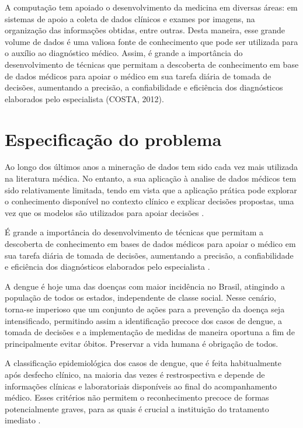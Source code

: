\documentclass[
	12pt,				%
	openright,			%
	oneside,	
	a4paper,				%
	english,				%
	brazil				%
]{abntex2/abntex2} %
\begin{document}
	A computação tem apoiado o desenvolvimento da medicina em diversas áreas: em sistemas de apoio a coleta de dados clínicos e exames por imagens, na organização das informações obtidas, entre outras. Desta maneira, esse grande volume de dados é uma valiosa fonte de conhecimento que pode ser utilizada para o auxílio ao diagnóstico médico. Assim, é grande a importância do desenvolvimento de técnicas que permitam a descoberta de conhecimento em base de dados médicos para apoiar o médico em sua tarefa diária de tomada de decisões, aumentando a precisão, a confiabilidade e eficiência dos diagnósticos elaborados pelo especialista (COSTA, 2012).

	\section{Especificação do problema}
		
		Ao longo dos últimos anos a mineração de dados tem sido cada vez mais utilizada na literatura médica. No entanto, a sua aplicação à analise de dados médicos tem sido relativamente limitada, tendo em vista que a aplicação prática pode explorar o conhecimento disponível no contexto clínico e explicar decisões propostas, uma vez que os modelos são utilizados para apoiar decisões \cite{bellazzi:2008}.
		
		É grande a importância do desenvolvimento de técnicas que permitam a descoberta de conhecimento em bases de dados médicos para apoiar o médico em sua tarefa diária de tomada de decisões, aumentando a precisão, a confiabilidade e eficiência dos diagnósticos elaborados pelo especialista \cite{costa:2012}.
		
		A dengue é hoje uma das doenças com maior incidência no Brasil, atingindo a população de todos os estados, independente de classe social. Nesse cenário, torna-se imperioso que um conjunto de ações para a prevenção da doença seja intensificado, permitindo assim a identificação precoce dos casos de dengue, a tomada de decisões e a implementação de medidas de maneira oportuna a fim de principalmente evitar óbitos. Preservar a vida humana é obrigação de todos.
		
		A classificação epidemiológica dos casos de dengue, que é feita habitualmente após desfecho clínico, na maioria das vezes é restrospectiva e depende de informações clínicas e laboratoriais disponíveis ao final do acompanhamento médico. Esses critérios não permitem o reconhecimento precoce de formas potencialmente graves, para as quais é crucial a instituição do tratamento imediato \cite{saude:2013}.
\end{document}
